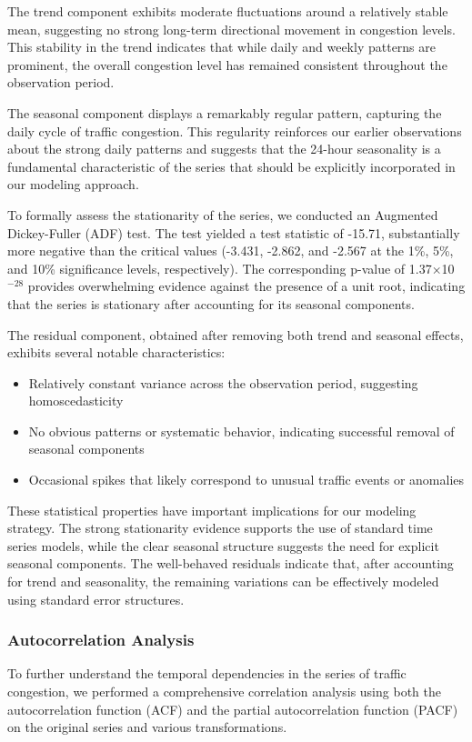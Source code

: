 \documentclass{article}
\begin{document}
The trend component exhibits moderate fluctuations around a relatively stable mean, suggesting no strong long-term directional movement in congestion levels. This stability in the trend indicates that while daily and weekly patterns are prominent, the overall congestion level has remained consistent throughout the observation period.

The seasonal component displays a remarkably regular pattern, capturing the daily cycle of traffic congestion. This regularity reinforces our earlier observations about the strong daily patterns and suggests that the 24-hour seasonality is a fundamental characteristic of the series that should be explicitly incorporated in our modeling approach.

To formally assess the stationarity of the series, we conducted an Augmented Dickey-Fuller (ADF) test. The test yielded a test statistic of -15.71, substantially more negative than the critical values (-3.431, -2.862, and -2.567 at the 1\%, 5\%, and 10\% significance levels, respectively). The corresponding p-value of 1.37×10$^{-28}$ provides overwhelming evidence against the presence of a unit root, indicating that the series is stationary after accounting for its seasonal components.

The residual component, obtained after removing both trend and seasonal effects, exhibits several notable characteristics:
\begin{itemize}
    \item Relatively constant variance across the observation period, suggesting homoscedasticity
    \item No obvious patterns or systematic behavior, indicating successful removal of seasonal components
    \item Occasional spikes that likely correspond to unusual traffic events or anomalies
\end{itemize}

These statistical properties have important implications for our modeling strategy. The strong stationarity evidence supports the use of standard time series models, while the clear seasonal structure suggests the need for explicit seasonal components. The well-behaved residuals indicate that, after accounting for trend and seasonality, the remaining variations can be effectively modeled using standard error structures.

\subsubsection{Autocorrelation Analysis}
To further understand the temporal dependencies in the series of traffic congestion, we performed a comprehensive correlation analysis using both the autocorrelation function (ACF) and the partial autocorrelation function (PACF) on the original series and various transformations.
\end{document}
